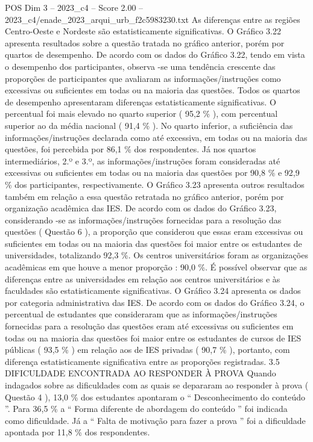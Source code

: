 \begin{textsample}{POS Dim 3 – 2023\_c4 – Score 2.00 – 2023\_c4/enade\_2023\_arqui\_urb\_f2c5983230.txt}
As diferenças entre as regiões Centro-Oeste e Nordeste são estatisticamente significativas.
O Gráfico 3.22 apresenta resultados sobre a questão tratada no gráfico anterior, porém por quartos de desempenho.
De acordo com os dados do Gráfico 3.22, tendo em vista o desempenho dos participantes, observa -se uma tendência crescente das proporções de participantes que avaliaram as informações/instruções como excessivas ou suficientes em todas ou na maioria das questões.
Todos os quartos de desempenho apresentaram diferenças estatisticamente significativas.
O percentual foi mais elevado no quarto superior ( 95,2 \% ), com percentual superior ao da média nacional ( 91,4 \% ).
No quarto inferior, a suficiência das informações/instruções declarada como até excessiva, em todas ou na maioria das questões, foi percebida por 86,1 \% dos respondentes.
Já nos quartos intermediários, 2.º e 3.º, as informações/instruções foram consideradas até excessivas ou suficientes em todas ou na maioria das questões por 90,8 \% e 92,9 \% dos participantes, respectivamente.
O Gráfico 3.23 apresenta outros resultados também em relação a essa questão retratada no gráfico anterior, porém por organização acadêmica das IES.
De acordo com os dados do Gráfico 3.23, considerando -se as informações/instruções fornecidas para a resolução das questões ( Questão 6 ), a proporção que considerou que essas eram excessivas ou suficientes em todas ou na maioria das questões foi maior entre os estudantes de universidades, totalizando 92,3 \%.
Os centros universitários foram as organizações acadêmicas em que houve a menor proporção : 90,0 \%.
É possível observar que as diferenças entre as universidades em relação aos centros universitários e às faculdades são estatisticamente significativas.
O Gráfico 3.24 apresenta os dados por categoria administrativa das IES.
De acordo com os dados do Gráfico 3.24, o percentual de estudantes que consideraram que as informações/instruções fornecidas para a resolução das questões eram até excessivas ou suficientes em todas ou na maioria das questões foi maior entre os estudantes de cursos de IES públicas ( 93,5 \% ) em relação aos de IES privadas ( 90,7 \% ), portanto, com diferença estatisticamente significativa entre as proporções registradas. 3.5 DIFICULDADE ENCONTRADA AO RESPONDER À PROVA Quando indagados sobre as dificuldades com as quais se depararam ao responder à prova ( Questão 4 ), 13,0 \% dos estudantes apontaram o “ Desconhecimento do conteúdo ”.
Para 36,5 \% a “ Forma diferente de abordagem do conteúdo ” foi indicada como dificuldade.
Já a “ Falta de motivação para fazer a prova ” foi a dificuldade apontada por 11,8 \% dos respondentes.

\end{textsample}
